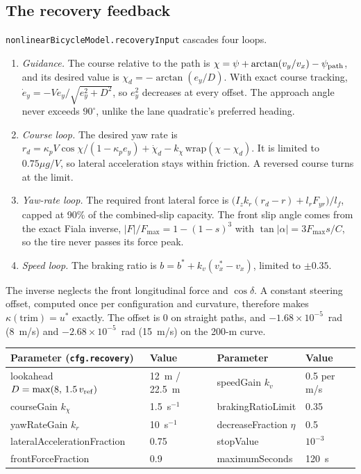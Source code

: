 \documentclass[11pt]{article}
\begin{document}
\subsection{The recovery feedback}
\texttt{nonlinearBicycleModel.recoveryInput} cascades four loops.
\begin{enumerate}
\item \emph{Guidance.} The course relative to the path is
$\chi=\psi+\arctan(v_y/v_x)-\psi_{\rm path}$, and its desired value is
$\chi_d=-\arctan(e_y/D)$. With exact course tracking,
$\dot e_y=-Ve_y/\sqrt{e_y^2+D^2}$, so $e_y^2$ decreases at every offset. The
approach angle never exceeds $90^\circ$, unlike the lane quadratic's preferred
heading.
\item \emph{Course loop.} The desired yaw rate is
$r_d=\kappa_pV\cos\chi/(1-\kappa_pe_y)+\dot\chi_d-k_\chi\,\mathrm{wrap}(\chi-\chi_d)$.
It is limited to $0.75\mu g/V$, so lateral acceleration stays within
friction. A reversed course turns at the limit.
\item \emph{Yaw-rate loop.} The required front lateral force is
$\bigl(I_zk_r(r_d-r)+l_rF_{yr}\bigr)/l_f$, capped at 90\% of the
combined-slip capacity. The front slip angle comes from the exact Fiala
inverse, $|F|/F_{\max}=1-(1-s)^3$ with $\tan|\alpha|=3F_{\max}s/C$, so the tire
never passes its force peak.
\item \emph{Speed loop.} The braking ratio is $b=b^*+k_v(v_x^*-v_x)$, limited to
$\pm0.35$.
\end{enumerate}
The inverse neglects the front longitudinal force and $\cos\delta$. A constant
steering offset, computed once per configuration and curvature, therefore makes
$\kappa(\text{trim})=u^*$ exactly. The offset is 0 on straight paths, and
$-1.68\times10^{-5}$~rad (8~m/s) and $-2.68\times10^{-5}$~rad (15~m/s) on the
200-m curve.
\begin{center}\footnotesize
\begin{tabular}{llll}
\toprule
Parameter (\texttt{cfg.recovery}) & Value & Parameter & Value\\
\midrule
lookahead $D=\max(8,\,1.5\,v_{\rm ref})$ & 12~m / 22.5~m & speedGain $k_v$ & 0.5 per m/s\\
courseGain $k_\chi$ & 1.5~s$^{-1}$ & brakingRatioLimit & 0.35\\
yawRateGain $k_r$ & 10~s$^{-1}$ & decreaseFraction $\eta$ & 0.5\\
lateralAccelerationFraction & 0.75 & stopValue & $10^{-3}$\\
frontForceFraction & 0.9 & maximumSeconds & 120~s\\
\bottomrule
\end{tabular}\end{center}
\end{document}

